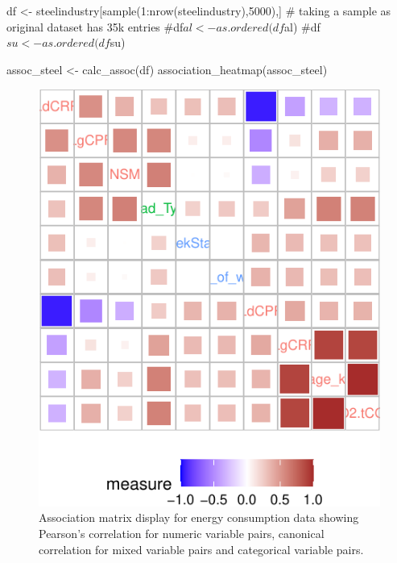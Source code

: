 \begin{Schunk}
\begin{Sinput}
df <- steelindustry[sample(1:nrow(steelindustry),5000),] # taking a sample as original dataset has 35k entries
#df$al <- as.ordered(df$al)
#df$su <- as.ordered(df$su)


assoc_steel <- calc_assoc(df)
association_heatmap(assoc_steel)
\end{Sinput}
\begin{figure}

{\centering \includegraphics{rj_paper_files/figure-latex/assoc-heatmap-1} 

}

\caption[Association matrix display for energy consumption data showing Pearson's correlation for numeric variable pairs, canonical correlation for mixed variable pairs and categorical variable pairs]{Association matrix display for energy consumption data showing Pearson's correlation for numeric variable pairs, canonical correlation for mixed variable pairs and categorical variable pairs.}\label{fig:assoc-heatmap}
\end{figure}
\end{Schunk}

